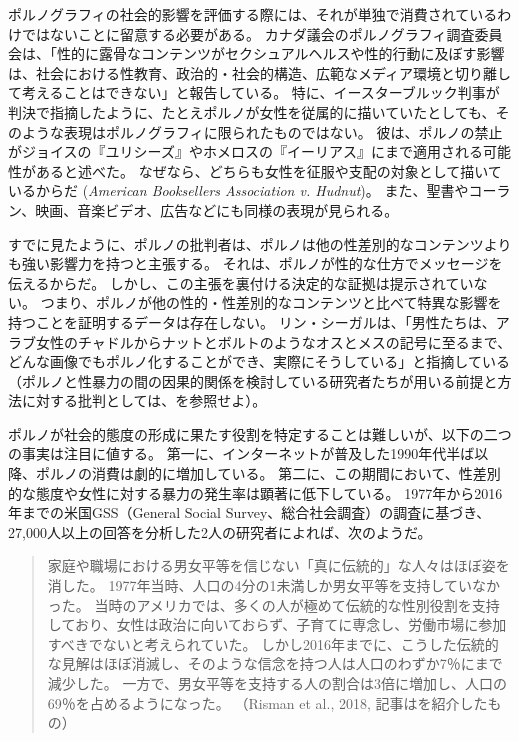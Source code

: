 \documentclass[paper=a4,book,openany]{jlreq}
\begin{document}
ポルノグラフィの社会的影響を評価する際には、それが単独で消費されているわけではないことに留意する必要がある。
カナダ議会のポルノグラフィ調査委員会は、「性的に露骨なコンテンツがセクシュアルヘルスや性的行動に及ぼす影響は、社会における性教育、政治的・社会的構造、広範なメディア環境と切り離して考えることはできない」と報告している\citep[p.11]{committee17:_repor_public_healt_effec_ease}。
特に、イースターブルック判事が判決で指摘したように、たとえポルノが女性を従属的に描いていたとしても、そのような表現はポルノグラフィに限られたものではない。
彼は、ポルノの禁止がジョイスの『ユリシーズ』やホメロスの『イーリアス』にまで適用される可能性があると述べた。
なぜなら、どちらも女性を征服や支配の対象として描いているからだ
(\emph{American Booksellers Association v. Hudnut})。
また、聖書やコーラン、映画、音楽ビデオ、広告などにも同様の表現が見られる。

すでに見たように、ポルノの批判者は、ポルノは他の性差別的なコンテンツよりも強い影響力を持つと主張する。
それは、ポルノが性的な仕方でメッセージを伝えるからだ。
しかし、この主張を裏付ける決定的な証拠は提示されていない。
つまり、ポルノが他の性的・性差別的なコンテンツと比べて特異な影響を持つことを証明するデータは存在しない。
リン・シーガルは、「男性たちは、アラブ女性のチャドルからナットとボルトのようなオスとメスの記号に至るまで、どんな画像でもポルノ化することができ、実際にそうしている」と指摘している
（ポルノと性暴力の間の因果的関係を検討している研究者たちが用いる前提と方法に対する批判としては、\citet{boyle00:_pornog_debat}を参照せよ）\citep[p.15]{segal93:_does_pornog_cause_violen}。

ポルノが社会的態度の形成に果たす役割を特定することは難しいが、以下の二つの事実は注目に値する。
第一に、インターネットが普及した1990年代半ば以降、ポルノの消費は劇的に増加している。
第二に、この期間において、性差別的な態度や女性に対する暴力の発生率は顕著に低下している。
1977年から2016年までの米国GSS（General Social Survey、総合社会調査）の調査に基づき、27,000人以上の回答を分析した2人の研究者によれば、次のようだ。

\begin{quote}
家庭や職場における男女平等を信じない「真に伝統的」な人々はほぼ姿を消した。
1977年当時、人口の4分の1未満しか男女平等を支持していなかった。
当時のアメリカでは、多くの人が極めて伝統的な性別役割を支持しており、女性は政治に向いておらず、子育てに専念し、労働市場に参加すべきでないと考えられていた。
しかし2016年までに、こうした伝統的な見解はほぼ消滅し、そのような信念を持つ人は人口のわずか7％にまで減少した。
一方で、男女平等を支持する人の割合は3倍に増加し、人口の69％を占めるようになった。
（Risman et al., 2018, 記事は\citet{scarborough19:_attit_stall_gender_revol}を紹介したもの）
\nocite{risman18:_good_news,scarborough19:_attit_stall_gender_revol,risman18:_good_news}
\end{quote}
\end{document}
